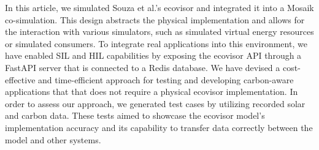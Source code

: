In this article, we simulated Souza et al.'s \cite{souza2023} ecovisor and
integrated it into a Mosaik co-simulation. This design abstracts the physical
implementation and allows for the interaction with various simulators, such as
simulated virtual energy resources or simulated consumers. To integrate real
applications into this environment, we have enabled SIL and HIL capabilities by
exposing the ecovisor API through a FastAPI server that is connected to a Redis
database. We have devised a cost-effective and time-efficient approach for
testing and developing carbon-aware applications that that does not require a
physical ecovisor implementation. In order to assess our approach, we generated
test cases by utilizing recorded solar and carbon data. These tests aimed to
showcase the ecovisor model's implementation accuracy and its capability to
transfer data correctly between the model and other systems.
